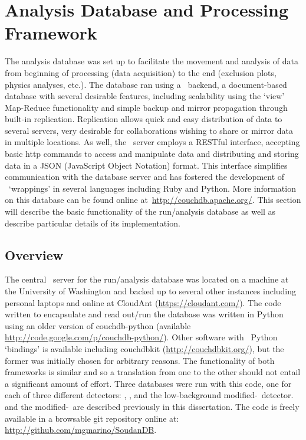 	\section{Analysis Database and Processing Framework}
	\label{sec:AnalysisDBProcFramework}
	The analysis database was set up to facilitate the movement and analysis of
data from beginning of processing (data acquisition) to the end (exclusion
plots, physics analyses, etc.).  The database ran using a \couchdb~backend, a
document-based database with several desirable features, including scalability
using the `view' Map-Reduce functionality and simple backup and mirror
propagation through built-in replication.  Replication allows quick and easy
distribution of data to several servers, very desirable for collaborations
wishing to share or mirror data in multiple locations.  As well, the \couchdb~server employs a RESTful interface, accepting basic http commands to access and
manipulate data and distributing and storing data in a JSON (JavaScript Object
Notation) format.  This interface simplifies communication with the database
server and has fostered the development of \couchdb~`wrappings' in several
languages including Ruby and Python.  More information on this database can be
found online at~\url{http://couchdb.apache.org/}.  This section will describe
the basic functionality of the run/analysis database as well as describe
particular details of its implementation.  

		\subsection{Overview}
		
	The central \couchdb~server for the run/analysis database was located on a
machine at the University of Washington and backed up to several other
instances including personal laptops and online at CloudAnt
(\url{https://cloudant.com/}).  The code written to encapsulate and read
out/run the database was written in Python using an older version of
couchdb-python (available \url{http://code.google.com/p/couchdb-python/}).
Other software with \couchdb~Python `bindings' is available including couchdbkit
(\url{http://couchdbkit.org/}), but the former was initially chosen for
arbitrary reasons.  The functionality of both frameworks is similar and so a
translation from one to the other should not entail a significant amount of
effort.  Three databases were run with this code, one for each of three
different detectors: , , and the low-background modified-\bege~detector.  
and the modified-\bege~are described previously in this dissertation.  The code is freely
available in a browsable git repository online at:
\url{http://github.com/mgmarino/SoudanDB}.  			

